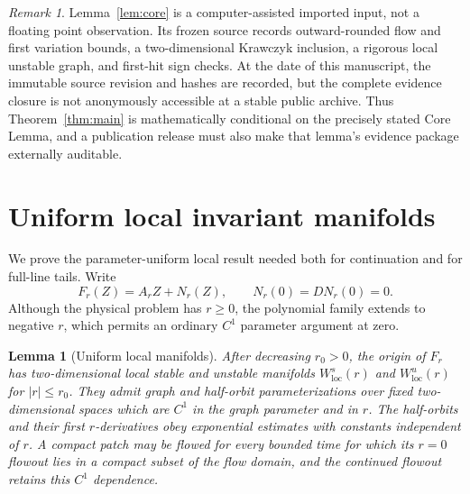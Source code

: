 \documentclass[11pt,reqno]{amsart}
\numberwithin{equation}{section}
\newtheorem{lemma}[theorem]{Lemma}
\theoremstyle{remark}
\newtheorem{remark}[theorem]{Remark}
\begin{document}
\begin{remark}\label{rem:evidence-status}
Lemma~\ref{lem:core} is a computer-assisted imported input, not a floating
point observation.  Its frozen source records outward-rounded flow and first
variation bounds, a two-dimensional Krawczyk inclusion, a rigorous local
unstable graph, and first-hit sign checks.  At the date of this manuscript,
the immutable source revision and hashes are recorded, but the complete
evidence closure is not anonymously accessible at a stable public archive.
Thus Theorem~\ref{thm:main} is mathematically conditional on the precisely
stated Core Lemma, and a publication release must also make that lemma's
evidence package externally auditable.
\end{remark}

\section{Uniform local invariant manifolds}\label{sec:manifolds}

We prove the parameter-uniform local result needed both for continuation and
for full-line tails.  Write
\begin{equation}\label{eq:linear-nonlinear}
 F_r(Z)=A_rZ+N_r(Z),
 \qquad N_r(0)=DN_r(0)=0.
\end{equation}
Although the physical problem has $r\ge0$, the polynomial family extends to
negative $r$, which permits an ordinary $C^1$ parameter argument at zero.

\begin{lemma}[Uniform local manifolds]\label{lem:uniform-manifolds}
After decreasing $r_0>0$, the origin of $F_r$ has two-dimensional local
stable and unstable manifolds $W^s_{\mathrm{loc}}(r)$ and
$W^u_{\mathrm{loc}}(r)$ for $|r|\le r_0$.  They admit graph and half-orbit
parameterizations over fixed two-dimensional spaces which are $C^1$ in the
graph parameter and in $r$.  The half-orbits and their first $r$-derivatives
obey exponential estimates with constants independent of $r$.  A compact
patch may be flowed for every bounded time for which its $r=0$ flowout lies
in a compact subset of the flow domain, and the continued flowout retains
this $C^1$ dependence.
\end{lemma}
\end{document}
